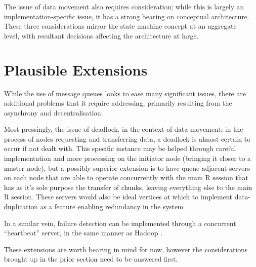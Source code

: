 \documentclass[a4paper,10pt]{article}
\begin{document}
The issue of data movement also requires consideration; while this is largely
an implementation-specific issue, it has a strong bearing on conceptual
architecture.
These three considerations mirror the state machine concept at an aggregate
level, with resultant decisions affecting the architecture at large.

\section{Plausible Extensions}

While the use of message queues looks to ease many significant issues, there
are additional problems that it require addressing, primarily resulting from
the asynchrony and decentralisation.

Most pressingly, the issue of deadlock, in the context of data movement; in the
process of nodes requesting and transferring data, a deadlock is almost certain
to occur if not dealt with.
This specific instance may be helped through careful implementation and more
processing on the initiator node (bringing it closer to a master node), but a
possibly superior extension is to have queue-adjacent servers on each node that
are able to operate concurrently with the main R session that has as it's sole
purpose the transfer of chunks, leaving everything else to the main R session.
These servers would also be ideal vertices at which to implement
data-duplication as a feature enabling redundancy in the system

In a similar vein, failure detection can be implemented through a concurrent
``heartbeat'' server, in the same manner as Hadoop \cite{white2012hadoop}.

These extensions are worth bearing in mind for now, however the considerations
brought up in the prior section need to be answered first.

\printbibliography{}
\end{document}
